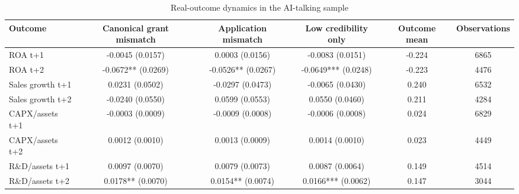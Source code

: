 \begin{table}[!htbp]
\centering
\caption{Real-outcome dynamics in the AI-talking sample}
\label{tab:real_outcome_dynamics_v31}
\begin{tabular}{lccccc}
\hline
Outcome & Canonical grant mismatch & Application mismatch & Low credibility only & Outcome mean & Observations \\
\hline
ROA t+1 & -0.0045 (0.0157) & 0.0003 (0.0156) & -0.0083 (0.0151) & -0.224 & 6865 \\
ROA t+2 & -0.0672** (0.0269) & -0.0526** (0.0267) & -0.0649*** (0.0248) & -0.223 & 4476 \\
Sales growth t+1 & 0.0231 (0.0502) & -0.0297 (0.0473) & -0.0065 (0.0430) & 0.240 & 6532 \\
Sales growth t+2 & -0.0240 (0.0550) & 0.0599 (0.0553) & 0.0550 (0.0460) & 0.211 & 4284 \\
CAPX/assets t+1 & -0.0003 (0.0009) & -0.0009 (0.0008) & -0.0006 (0.0008) & 0.024 & 6829 \\
CAPX/assets t+2 & 0.0012 (0.0010) & 0.0013 (0.0009) & 0.0014 (0.0010) & 0.023 & 4449 \\
R\&D/assets t+1 & 0.0097 (0.0070) & 0.0079 (0.0073) & 0.0087 (0.0064) & 0.149 & 4514 \\
R\&D/assets t+2 & 0.0178** (0.0070) & 0.0154** (0.0074) & 0.0166*** (0.0062) & 0.147 & 3044 \\
\hline
\end{tabular}
\end{table}
